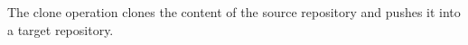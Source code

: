\documentclass[../main.tex]{subfiles}
\begin{document}
The clone operation clones the content of the source repository and pushes it into a target repository.
\end{document}

